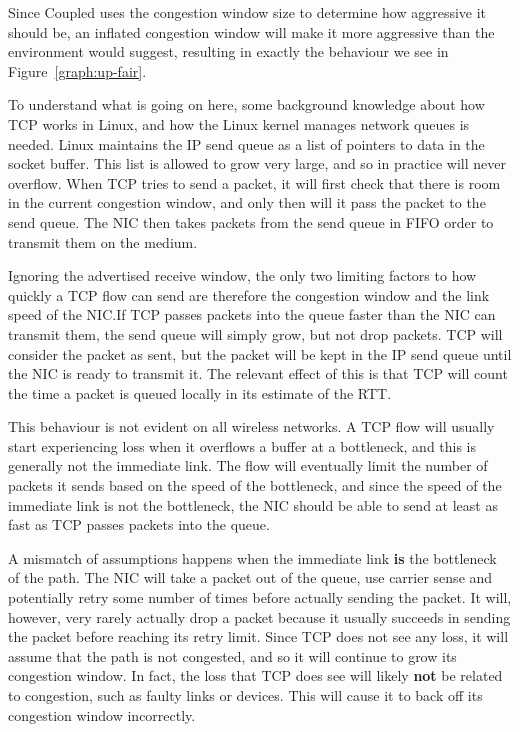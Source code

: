 Since Coupled uses the congestion window size to determine how aggressive it
should be, an inflated congestion window will make it more aggressive than the 
environment would suggest, resulting in exactly the behaviour we see in
Figure~\ref{graph:up-fair}.

To understand what is going on here, some background knowledge about how TCP
works in Linux, and how the Linux kernel manages network queues is needed. Linux
maintains the IP send queue as a list of pointers to data in the socket buffer. 
This list is allowed to grow very large, and so in practice will never overflow.
When TCP tries to send a packet, it will first check that there is room in
the current congestion window, and only then will it pass the packet to the
send queue. The NIC then takes packets  from the send queue in FIFO order to
transmit them on the medium.

Ignoring the advertised receive window, the only two limiting factors to how
quickly a TCP flow
can send are therefore the congestion window and the link speed of the NIC.\@ If
TCP passes packets into the queue faster than the NIC can transmit them, the
send queue will simply grow, but not drop packets. TCP will consider the
packet as sent, but the packet will be kept in the IP send queue until
the NIC is ready to transmit it. The relevant effect of this is that TCP will
count the time a packet is queued locally in its estimate of the RTT.

This behaviour is not evident on all wireless networks. A TCP flow
will usually start experiencing loss when it overflows a
buffer at a bottleneck, and this is generally not the immediate link.
The flow will eventually limit the number of packets it sends based on the
speed of the bottleneck, and since the speed of the immediate link is not
the bottleneck, the NIC should be able to send at least as fast as TCP passes
packets into the queue.

A mismatch of assumptions happens when the immediate link \textbf{is} the 
bottleneck of the path. The NIC will take a packet out of the queue, use carrier 
sense and potentially retry some number of times before actually sending the 
packet. It will, however, very rarely actually drop a packet because it usually 
succeeds in sending the packet before reaching its retry limit. Since TCP does 
not see any loss, it will assume that the path is not congested, and so it will 
continue to grow its congestion window.  In fact, the loss that TCP does see 
will likely \textbf{not} be related to congestion, such as faulty links or devices.
This will cause it to back off its congestion window incorrectly.

